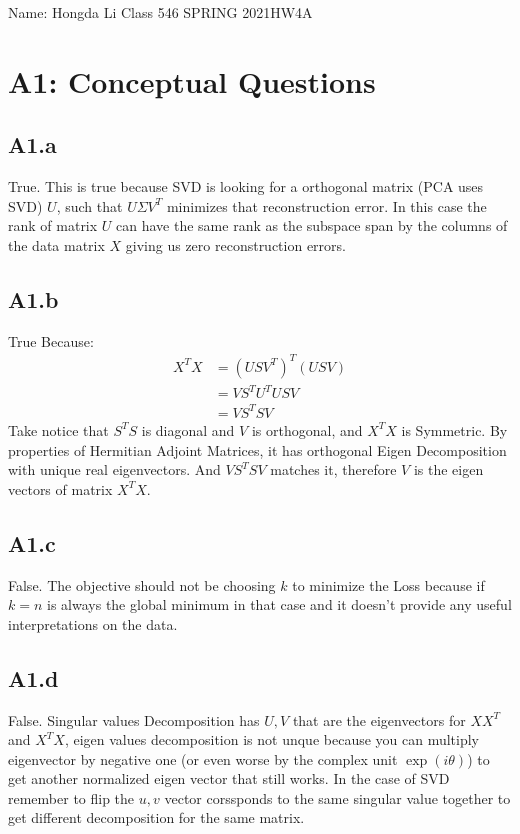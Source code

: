 \documentclass[]{article}
\begin{document}
\begin{center}
    Name: Hongda Li \quad Class 546 SPRING 2021\quad HW4A
\end{center}

\section*{A1: Conceptual Questions}
    \subsection*{A1.a}
        True. This is true because SVD is looking for a orthogonal matrix (PCA uses SVD) $U$, such that $U\Sigma V^T$ minimizes that reconstruction error. In this case the rank of matrix $U$ can have the same rank as the subspace span by the columns of the data matrix $X$ giving us zero reconstruction errors. 
    \subsection*{A1.b}
        True Because: 
        \begin{align*}\tag{A1.b.1}\label{eqn:A1.b.1}
            X^TX &= (USV^T)^T(USV)
            \\
            &= VS^TU^TUSV
            \\
            &= VS^TSV
        \end{align*}
        Take notice that $S^TS$ is diagonal and $V$ is orthogonal, and $X^TX$ is Symmetric. By properties of Hermitian Adjoint Matrices, it has orthogonal Eigen Decomposition with unique real eigenvectors. And $VS^TSV$ matches it, therefore $V$ is the eigen vectors of matrix $X^TX$. 
    \subsection*{A1.c}
        False. The objective should not be choosing $k$ to minimize the Loss because if $k = n$ is always the global minimum in that case and it doesn't provide any useful interpretations on the data. 
    \subsection*{A1.d}
        False. Singular values Decomposition has $U, V$ that are the eigenvectors for $XX^T$ and $X^TX$, eigen values decomposition is not unque because you can multiply eigenvector by negative one (or even worse by the complex unit $\exp(i\theta)$) to get another normalized eigen vector that still works. In the case of SVD remember to flip the $u, v$ vector corssponds to the same singular value together to get different decomposition for the same matrix. 
\end{document}

